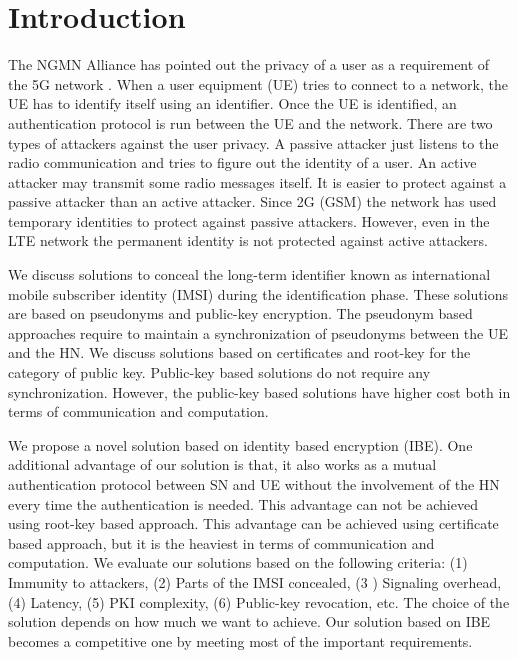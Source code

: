 \documentclass{river-journal}
\begin{document}
\section{Introduction}
\label{intro} The NGMN Alliance has pointed out the privacy of a user as a requirement of the 5G network \cite{NGMN_white_paper}. When a user equipment (UE) tries to connect to a network, the UE has to identify itself using an identifier. Once the UE is identified, an authentication protocol is run between the UE and the network. There are two types of attackers against the user privacy. A passive attacker just listens to the radio communication and tries to figure out the identity of a user. An active attacker may transmit some radio messages itself. It is easier to protect against a passive attacker than an active attacker. Since 2G (GSM) the network has used temporary identities to protect against passive attackers. However, even in the LTE network the permanent identity is not protected against active attackers.

We discuss solutions to conceal the long-term identifier known as international mobile subscriber identity (IMSI) during the identification phase. These solutions are based on pseudonyms and public-key encryption. The pseudonym based approaches require to maintain a synchronization of pseudonyms between the UE and the HN. We discuss solutions based on certificates and root-key for the category of public key. Public-key based solutions do not require any synchronization. However, the public-key based solutions have higher cost both in terms of communication and computation. 

We propose a novel solution based on identity based encryption (IBE). One additional advantage of our solution is that, it also works as a mutual authentication protocol between SN and UE without the involvement of the HN every time the authentication is needed. This advantage can not be achieved using root-key based approach. This advantage can be achieved using certificate based approach, but it is the heaviest in terms of communication and computation. 
We evaluate our solutions based on the following criteria: (1) Immunity to attackers, (2) Parts of the IMSI concealed, (3 ) Signaling overhead, (4) Latency, (5) PKI complexity, (6) Public-key revocation, etc. The choice of the solution depends on how much we want to achieve. Our solution based on IBE becomes a competitive one by meeting most of the important requirements.
\end{document}
